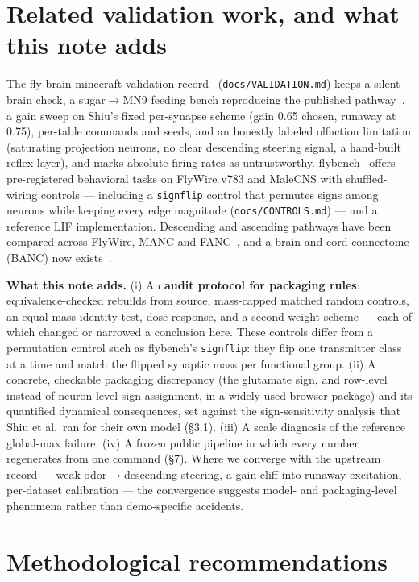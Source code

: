 \documentclass[11pt,a4paper]{article}
\begin{document}
\section{Related validation work, and what this note adds}

The fly-brain-minecraft validation record~\cite{fbm} (\texttt{docs/VALIDATION.md})
keeps a silent-brain check, a sugar$\to$MN9 feeding bench reproducing the
published pathway~\cite{shiu2024}, a gain sweep on Shiu's fixed per-synapse
scheme (gain 0.65 chosen, runaway at 0.75), per-table commands and seeds, and
an honestly labeled olfaction limitation (saturating projection neurons, no
clear descending steering signal, a hand-built reflex layer), and marks
absolute firing rates as untrustworthy. flybench~\cite{flybench} offers
pre-registered behavioral tasks on FlyWire v783 and MaleCNS with
shuffled-wiring controls --- including a \texttt{signflip} control that permutes
signs among neurons while keeping every edge magnitude (\texttt{docs/CONTROLS.md})
--- and a reference LIF implementation. Descending and
ascending pathways have been compared across FlyWire, MANC and
FANC~\cite{sturner2025}, and a brain-and-cord connectome (BANC) now
exists~\cite{bates2026}.

\textbf{What this note adds.} (i) An \textbf{audit protocol for packaging
rules}: equivalence-checked rebuilds from source, mass-capped matched random
controls, an equal-mass identity test, dose-response, and a second weight
scheme --- each of which changed or narrowed a conclusion here. These
controls differ from a permutation control such as flybench's
\texttt{signflip}: they flip one transmitter class at a time and match the
flipped synaptic mass per functional group. (ii) A concrete, checkable
packaging discrepancy (the glutamate sign, and row-level instead of
neuron-level sign assignment, in a widely used browser package) and its
quantified dynamical consequences, set against the sign-sensitivity analysis
that Shiu et al.\ ran for their own model (\S3.1). (iii) A scale
diagnosis of the reference global-max failure. (iv) A frozen public pipeline
in which every number regenerates from one command (\S7). Where we converge
with the upstream record --- weak odor$\to$descending steering, a gain cliff
into runaway excitation, per-dataset calibration --- the convergence suggests
model- and packaging-level phenomena rather than demo-specific accidents.

\section{Methodological recommendations}
\end{document}
